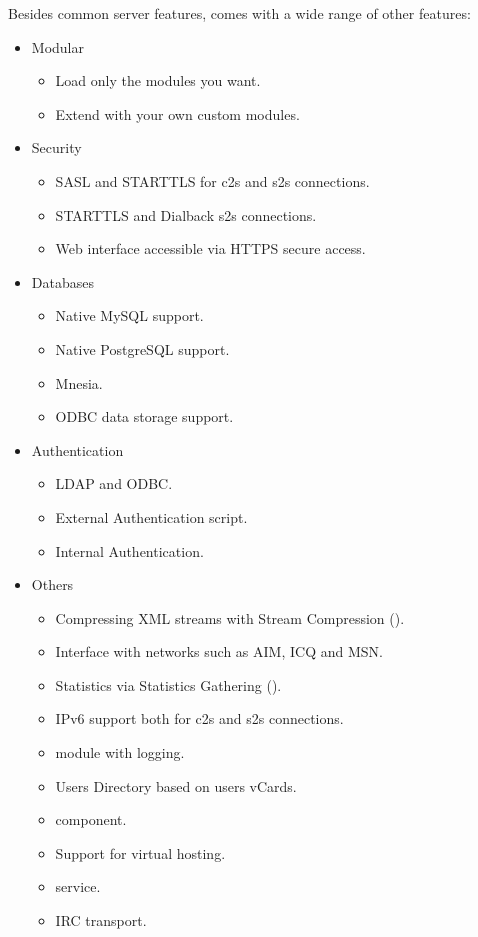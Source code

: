 Besides common \Jabber{} server features, \ejabberd{} comes with a wide range of other features:
\begin{itemize}
\item Modular
\begin{itemize}
\item Load only the modules you want.
\item Extend \ejabberd{} with your own custom modules.
\end{itemize}
\item Security
\begin{itemize}
\item SASL and STARTTLS for c2s and s2s connections.\improved{}
\item STARTTLS and Dialback s2s connections.
\item Web interface accessible via HTTPS secure access.
\end{itemize}
\item Databases
\begin{itemize}
\item Native MySQL support.\new{}
\item Native PostgreSQL support.
\item Mnesia.
\item ODBC data storage support. 
\end{itemize}
\item Authentication
\begin{itemize}
\item LDAP and ODBC. 
\item External Authentication script.
\item Internal Authentication.
\end{itemize}
\item Others
\begin{itemize}
\item Compressing XML streams with Stream Compression ().\new{}
\item Interface with networks such as AIM, ICQ and MSN.
\item Statistics via Statistics Gathering ().
\item IPv6 support both for c2s and s2s connections.
\item {} module with logging.\improved{}
\item Users Directory based on users vCards.
\item {} component.
\item Support for virtual hosting. 
\item {} service.
\item IRC transport.\improved{}
\end{itemize}
\end{itemize}